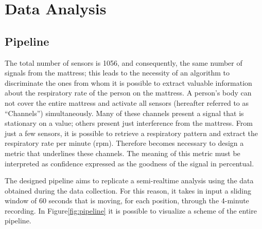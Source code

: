 \chapter{Data Analysis}
\section{Pipeline}
The total number of sensors is 1056, and consequently, the same number of signals from the mattress; this leads to the necessity of an algorithm to discriminate the ones from whom it is possible to extract valuable information about the respiratory rate of the person on the mattress. A person's body can not cover the entire mattress and activate all sensors (hereafter referred to as “Channels”) simultaneously.
Many of these channels present a signal that is stationary on a value; others present just interference from the mattress. From just a few sensors, it is possible to retrieve a respiratory pattern and extract the respiratory rate per minute (rpm). Therefore becomes necessary to design a metric that underlines these channels. The meaning of this metric must be interpreted as confidence expressed as the goodness of the signal in percentual.

The designed pipeline aims to replicate a semi-realtime analysis using the data obtained during the data collection. 
For this reason, it takes in input a sliding window of 60 seconds that is moving, for each position, through the 4-minute recording.
In Figure\ref{fig:pipeline} it is possible to visualize a scheme of the entire pipeline.

